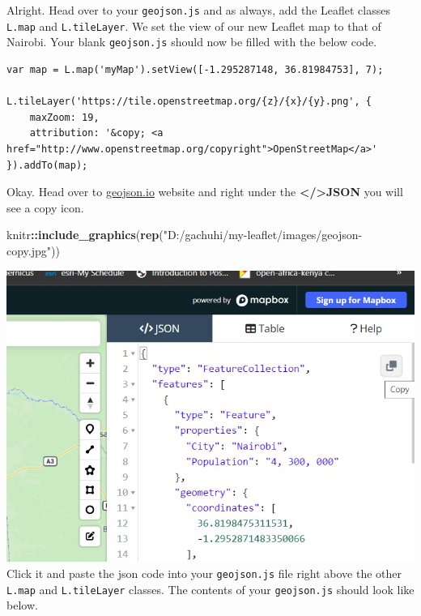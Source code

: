 \documentclass[
]{book}
\newenvironment{Shaded}{\begin{snugshade}}{\end{snugshade}}
\newcommand{\FunctionTok}[1]{\textcolor[rgb]{0.13,0.29,0.53}{\textbf{#1}}}
\newcommand{\NormalTok}[1]{#1}
\newcommand{\SpecialCharTok}[1]{\textcolor[rgb]{0.81,0.36,0.00}{\textbf{#1}}}
\newcommand{\StringTok}[1]{\textcolor[rgb]{0.31,0.60,0.02}{#1}}
\begin{document}
Alright. Head over to your \texttt{geojson.js} and as always, add the Leaflet classes \texttt{L.map} and \texttt{L.tileLayer}. We set the view of our new Leaflet map to that of Nairobi. Your blank \texttt{geojson.js} should now be filled with the below code.

\begin{verbatim}
var map = L.map('myMap').setView([-1.295287148, 36.81984753], 7);

L.tileLayer('https://tile.openstreetmap.org/{z}/{x}/{y}.png', {
    maxZoom: 19,
    attribution: '&copy; <a href="http://www.openstreetmap.org/copyright">OpenStreetMap</a>'
}).addTo(map);
\end{verbatim}

Okay. Head over to \url{geojson.io} website and right under the \textbf{\textless/\textgreater JSON} you will see a copy icon.

\begin{Shaded}
\begin{Highlighting}[]
\NormalTok{knitr}\SpecialCharTok{::}\FunctionTok{include\_graphics}\NormalTok{(}\FunctionTok{rep}\NormalTok{(}\StringTok{"D:/gachuhi/my{-}leaflet/images/geojson{-}copy.jpg"}\NormalTok{))}
\end{Highlighting}
\end{Shaded}

\includegraphics{../images/geojson-copy.jpg}
Click it and paste the json code into your \texttt{geojson.js} file right above the other \texttt{L.map} and \texttt{L.tileLayer} classes. The contents of your \texttt{geojson.js} should look like below.
\end{document}
